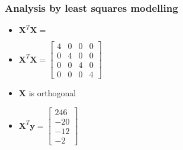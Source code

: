\begin{frame}\frametitle{Analysis by least squares modelling}
	\begin{itemize}
		\item	$\mathbf{X}^T\mathbf{X} =$
		\item	$\mathbf{X}^T\mathbf{X} =
		\begin{bmatrix}
			4 & 0 & 0 & 0\\
			0 & 4 & 0 & 0\\
			0 & 0 & 4 & 0\\
			0 & 0 & 0 & 4
		\end{bmatrix}
		$
		\item	$\mathbf{X}$ is orthogonal
		\item	$\mathbf{X}^T\mathbf{y} =
		\begin{bmatrix}
			246 \\
			-20 \\
			-12 \\
			-2
		\end{bmatrix}
		$
	\end{itemize}
\end{frame}

